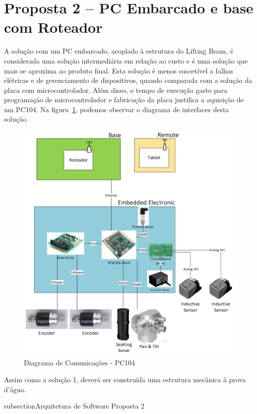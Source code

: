 \section{Proposta 2 – PC Embarcado e base com Roteador}

A solução com um PC embarcado, acoplado à estrutura do Lifting Beam, é
considerada uma solução intermediária em relação ao custo e é uma solução que
mais se aproxima ao produto final. Esta solução é menos suscetível a falhas
elétricas e de gerenciamento de dispositivos, quando comparada com a solução da
placa com microcontrolador. Além disso, o tempo de execução gasto para programação de microcontrolador e fabricação da placa justifica a aquisição de um PC104. Na figura~\ref{pc104}, podemos observar o diagrama de interfaces desta solução.

\begin{figure}[H]
    \centering
    \includegraphics[width=1\columnwidth]{figs/eletronica/4.png}
    \caption{Diagrama de Comunicações - PC104}
    \label{pc104}
\end{figure} 
 
Assim como a solução 1, deverá ser construída uma estrutura mecânica à prova d’água.

subsection{Arquitetura de Software Proposta 2}


